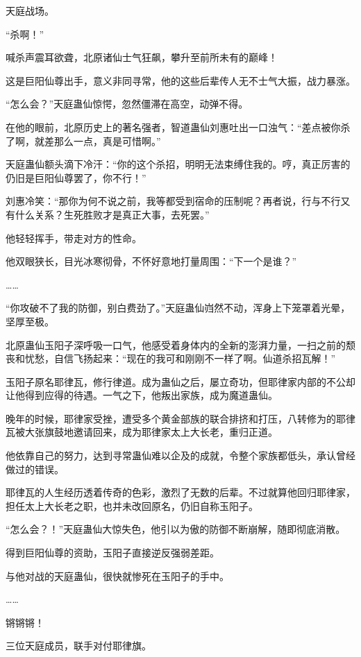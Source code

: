 
\begin{this_body}

天庭战场。

“杀啊！”

喊杀声震耳欲聋，北原诸仙士气狂飙，攀升至前所未有的巅峰！

这是巨阳仙尊出手，意义非同寻常，他的这些后辈传人无不士气大振，战力暴涨。

“怎么会？”天庭蛊仙惊愕，忽然僵滞在高空，动弹不得。

在他的眼前，北原历史上的著名强者，智道蛊仙刘惠吐出一口浊气：“差点被你杀了啊，就差那么一点，真是可惜啊。”

天庭蛊仙额头滴下冷汗：“你的这个杀招，明明无法束缚住我的。哼，真正厉害的仍旧是巨阳仙尊罢了，你不行！”

刘惠冷笑：“那你为何不说之前，我等都受到宿命的压制呢？再者说，行与不行又有什么关系？生死胜败才是真正大事，去死罢。”

他轻轻挥手，带走对方的性命。

他双眼狭长，目光冰寒彻骨，不怀好意地打量周围：“下一个是谁？”

……

“你攻破不了我的防御，别白费劲了。”天庭蛊仙岿然不动，浑身上下笼罩着光晕，坚厚至极。

北原蛊仙玉阳子深呼吸一口气，他感受着身体内的全新的澎湃力量，一扫之前的颓丧和忧愁，自信飞扬起来：“现在的我可和刚刚不一样了啊。仙道杀招瓦解！”

玉阳子原名耶律瓦，修行律道。成为蛊仙之后，屡立奇功，但耶律家内部的不公却让他得到应得的待遇。一气之下，他叛出家族，成为魔道蛊仙。

晚年的时候，耶律家受挫，遭受多个黄金部族的联合排挤和打压，八转修为的耶律瓦被大张旗鼓地邀请回来，成为耶律家太上大长老，重归正道。

他依靠自己的努力，达到寻常蛊仙难以企及的成就，令整个家族都低头，承认曾经做过的错误。

耶律瓦的人生经历透着传奇的色彩，激烈了无数的后辈。不过就算他回归耶律家，担任太上大长老之职，也并未改回原名，仍旧自称玉阳子。

“怎么会？！”天庭蛊仙大惊失色，他引以为傲的防御不断崩解，随即彻底消散。

得到巨阳仙尊的资助，玉阳子直接逆反强弱差距。

与他对战的天庭蛊仙，很快就惨死在玉阳子的手中。

……

锵锵锵！

三位天庭成员，联手对付耶律旗。


\end{this_body}
